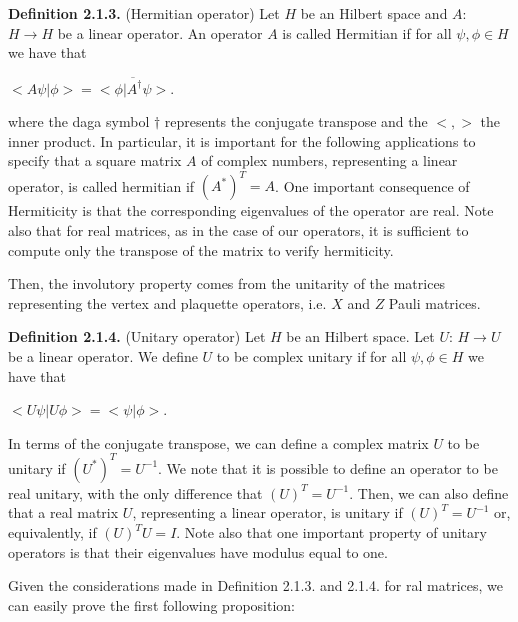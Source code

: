 \documentclass[12pt]{report}
\begin{document}
	
	\begin{minipage}{1\textwidth}	
		
		
		\textbf{Definition 2.1.3.} (Hermitian operator) Let $H$ be an Hilbert space and  $A$: $H \rightarrow H$ be a linear operator. An operator $A$ is called Hermitian if for all $\psi,\phi \in H$ we have that\newline
		
		\begin{center}
			$<A\psi|\phi> = \overline{<\phi|A^{\dagger}\psi>}$.
		\end{center}
		
		where the daga symbol $\dagger$ represents the conjugate transpose and the $<,>$ the inner product.
		In particular, it is important for the following applications to specify that a square matrix $A$ of complex numbers, representing a linear operator, is called hermitian if $(A^*)^T = A$. One important consequence of Hermiticity is that the corresponding eigenvalues of the operator are real. Note also that for real matrices, as in the case of our operators, it is sufficient to compute only the transpose of the matrix to verify hermiticity. \newline
		
		Then, the involutory property comes from the unitarity of the matrices representing the vertex and plaquette operators, i.e. $X$ and $Z$ Pauli matrices. \newline
		
		\textbf{Definition 2.1.4.} (Unitary operator) Let $H$ be an Hilbert space. Let $U$: $H \rightarrow U$ be a linear operator. We define $U$ to be complex unitary if for all $\psi,\phi \in H$ we have that\newline
		
		\begin{center}
			$<U\psi|U\phi> = <\psi|\phi>$.
		\end{center}
		
	    In terms of the conjugate transpose, we can define a complex matrix $U$ to be unitary if $ (U^*)^T=U^{-1}$. We note that it is possible to define an operator to be real unitary, with the only difference that $(U)^T = U^{-1}$. Then, we can also define that a real matrix $U$, representing a linear operator, is unitary if $(U)^T = U^{-1}$ or, equivalently, if $(U)^T U=I$. Note also that one important property of  unitary operators is that their eigenvalues have modulus equal to one.\newline
		
		Given the considerations made in Definition 2.1.3. and 2.1.4. for ral matrices, we can easily prove the first following proposition: \newline
		

\end{minipage}
\end{document}
